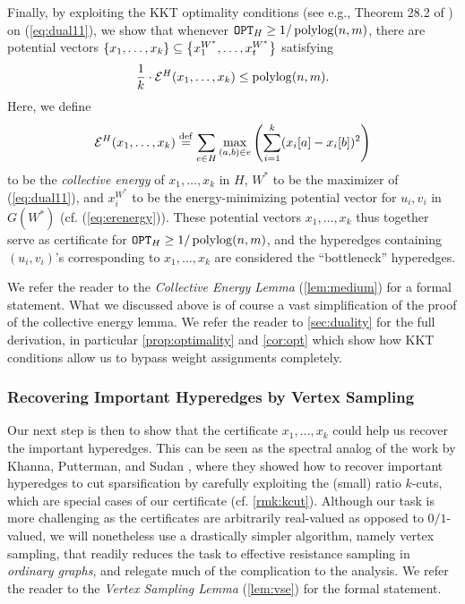 \documentclass{article}
\begin{document}
Finally, by exploiting the KKT optimality conditions (see e.g., Theorem 28.2 of \cite{Rockafellar70}) on (\ref{eq:dual11}),
we show that
whenever $\mathtt{OPT}_H \geq 1/\operatorname{polylog}(n,m)$,
there are potential vectors
$\left\{x_1,\ldots,x_k \right\} \subseteq \left\{x_1^{W^*},\ldots,x_t^{W^*} \right\}$
satisfying
\begin{align}\label{eq:cert}
    \frac{1}{k}\cdot
    \mathcal{E}^H(x_1,\ldots,x_k)
    \leq \operatorname{polylog}(n,m).
\end{align}
Here, we define
\begin{align}\label{eq:collectiveenergyoverview}
    \mathcal{E}^H(x_1,\ldots,x_k) \stackrel{\mathrm{def}}{=}
    \sum_{e\in H}
    \max_{(a,b)\in e}
    \left(
    \sum_{i=1}^{k} (x_i[a]-x_i[b])^2 
    \right)
\end{align}
to be the \textit{collective energy} of $x_1,\ldots,x_k$ in $H$,
$W^*$ to be the maximizer of (\ref{eq:dual11}),
and $x_i^{W^*}$ to be the energy-minimizing potential vector for $u_i,v_i$ in $G(W^*)$ (cf. (\ref{eq:erenergy})).
These potential vectors $x_1,\ldots,x_k$ thus together serve as certificate
for $\mathtt{OPT}_H \geq 1/\operatorname{polylog}(n,m)$,
and the hyperedges containing $(u_i,v_i)$'s corresponding
to $x_1,\ldots,x_k$ are considered the ``bottleneck'' hyperedges.

We refer the reader to the \textit{Collective Energy Lemma} (\cref{lem:medium}) for a formal statement. What we discussed above is of course a vast simplification of
the proof of the collective energy lemma. We refer the reader to \cref{sec:duality}
for the full derivation, in particular
\cref{prop:optimality} and
\cref{cor:opt} which show
how KKT conditions allow us to bypass weight assignments
completely.

\subsubsection{Recovering Important Hyperedges by Vertex Sampling}\label{sec:vsintro}

Our next step is then to show that the certificate $x_1,\ldots,x_k$ could help us recover
the important hyperedges. This can be seen as the spectral analog
of the work by Khanna, Putterman, and Sudan \cite{KPS24c}, where they showed
how to recover important hyperedges to cut sparsification
by carefully exploiting the (small) ratio
$k$-cuts, which are special cases of our certificate (cf. \cref{rmk:kcut}).
Although our task is more challenging as the
certificates are
arbitrarily real-valued
as opposed to $0/1$-valued,
we will nonetheless use a
drastically simpler algorithm, namely vertex sampling,
that readily reduces the task to effective resistance sampling in
\textit{ordinary graphs}, and relegate much of the complication to the analysis.
We refer the reader to the \textit{Vertex Sampling Lemma} (\cref{lem:vse})
for the formal statement.
\end{document}
